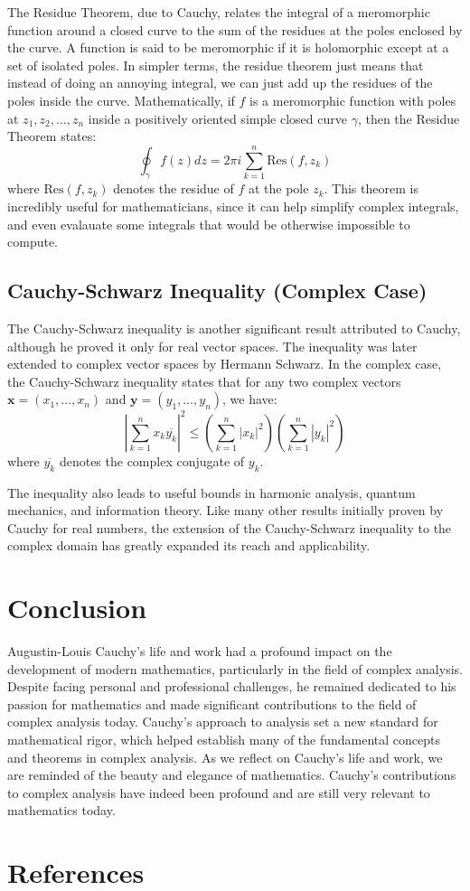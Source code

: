 \documentclass[12pt,letterpaper]{article}
\begin{document}
The Residue Theorem, due to Cauchy, relates the integral of a meromorphic function around a closed curve to the sum of the residues at the poles enclosed by the curve. 
A function is said to be meromorphic if it is holomorphic except at a set of isolated poles. 
In simpler terms, the residue theorem just means that instead of doing an annoying integral, we can just add up the residues of the poles inside the curve.
Mathematically, if $f$ is a meromorphic function with poles at $z_1, z_2, \ldots, z_n$ inside a positively oriented simple closed curve $\gamma$, then the Residue Theorem states:
$$\oint_\gamma f(z) dz = 2\pi i \sum_{k=1}^n \text{Res}(f, z_k)$$
where $\text{Res}(f, z_k)$ denotes the residue of $f$ at the pole $z_k$.
This theorem is incredibly useful for mathematicians, since it can help simplify complex integrals, and even evalauate some integrals that would be otherwise impossible to compute.

\subsection{Cauchy-Schwarz Inequality (Complex Case)}
The Cauchy-Schwarz inequality is another significant result attributed to Cauchy, although he proved it only for real vector spaces. 
The inequality was later extended to complex vector spaces by Hermann Schwarz. 
In the complex case, the Cauchy-Schwarz inequality states that for any two complex vectors $\mathbf{x} = (x_1, \ldots, x_n)$ and $\mathbf{y} = (y_1, \ldots, y_n)$, we have:
$$\left| \sum_{k=1}^n x_k \overline{y_k} \right|^2 \leq \left(\sum_{k=1}^n |x_k|^2\right) \left(\sum_{k=1}^n |y_k|^2\right)$$
where $\overline{y_k}$ denotes the complex conjugate of $y_k$. \cite{BerkeleyNotes}

The inequality also leads to useful bounds in harmonic analysis, quantum mechanics, and information theory. 
Like many other results initially proven by Cauchy for real numbers, the extension of the Cauchy-Schwarz inequality to the complex domain has greatly expanded its reach and applicability.

\section{Conclusion}
Augustin-Louis Cauchy's life and work had a profound impact on the development of modern mathematics, particularly in the field of complex analysis. 
Despite facing personal and professional challenges, he remained dedicated to his passion for mathematics and made significant contributions to the field of complex analysis today.
Cauchy's approach to analysis set a new standard for mathematical rigor, which helped establish many of the fundamental concepts and theorems in complex analysis. 
As we reflect on Cauchy's life and work, we are reminded of the beauty and elegance of mathematics. 
Cauchy's contributions to complex analysis have indeed been profound and are still very relevant to mathematics today.

\section{References}
\printbibliography

\end{document}
